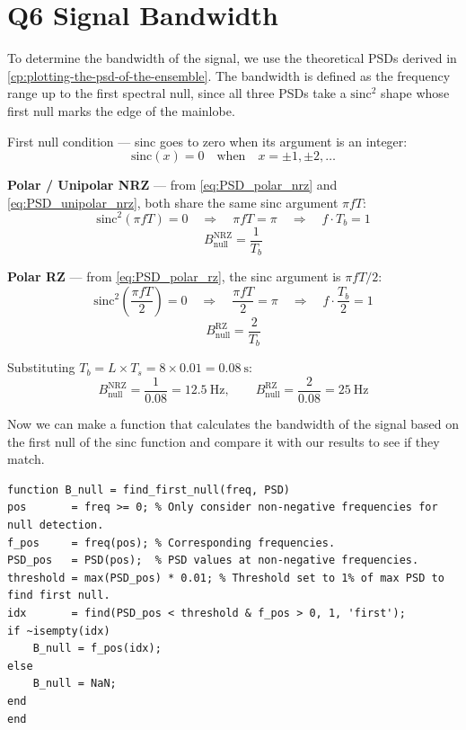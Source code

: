 \chapter[Q6 Signal Bandwidth]{Q6 Signal Bandwidth}
\label{cp:q6-signal-bandwidth}

To determine the bandwidth of the signal, we use the theoretical PSDs derived
in \autoref{cp:plotting-the-psd-of-the-ensemble}. The bandwidth is defined as
the frequency range up to the first spectral null, since all three PSDs take
a $\text{sinc}^2$ shape whose first null marks the edge of the mainlobe.

First null condition — sinc goes to zero when its argument is an integer:
\[
    \text{sinc}(x) = 0 \quad \text{when} \quad x = \pm 1, \pm 2, \ldots
\]

\textbf{Polar / Unipolar NRZ} — from \autoref{eq:PSD_polar_nrz} and
\autoref{eq:PSD_unipolar_nrz}, both share the same sinc argument $\pi f T$:
\[
    \text{sinc}^2(\pi f T) = 0
    \quad \Rightarrow \quad \pi f T = \pi
    \quad \Rightarrow \quad f \cdot T_b = 1
\]
\[
    \boxed{B_{\text{null}}^{\text{NRZ}} = \frac{1}{T_b}}
\]

\textbf{Polar RZ} — from \autoref{eq:PSD_polar_rz}, the sinc argument is
$\pi f T / 2$:
\[
    \text{sinc}^2\!\left(\frac{\pi f T}{2}\right) = 0
    \quad \Rightarrow \quad \frac{\pi f T}{2} = \pi
    \quad \Rightarrow \quad f \cdot \frac{T_b}{2} = 1
\]
\[
    \boxed{B_{\text{null}}^{\text{RZ}} = \frac{2}{T_b}}
\]

Substituting $T_b = L \times T_s = 8 \times 0.01 = 0.08\ \text{s}$:
\[
    B_{\text{null}}^{\text{NRZ}} = \frac{1}{0.08} = 12.5\ \text{Hz}, \qquad
    B_{\text{null}}^{\text{RZ}}  = \frac{2}{0.08} = 25\ \text{Hz}
\]

Now we can make a function that calculates the bandwidth of the signal based on
the first null of the sinc function and compare it with our results to see if
they match.

\begin{listing}[H]
    \caption{Bandwidth Calculation Function}
    \label{listing:BandwidthCalculationFunction}
    \begin{verbatim}
function B_null = find_first_null(freq, PSD)
pos       = freq >= 0; % Only consider non-negative frequencies for null detection.
f_pos     = freq(pos); % Corresponding frequencies.
PSD_pos   = PSD(pos);  % PSD values at non-negative frequencies.
threshold = max(PSD_pos) * 0.01; % Threshold set to 1% of max PSD to find first null.
idx       = find(PSD_pos < threshold & f_pos > 0, 1, 'first');
if ~isempty(idx)
    B_null = f_pos(idx);
else
    B_null = NaN;
end
end
    \end{verbatim}
\end{listing}

